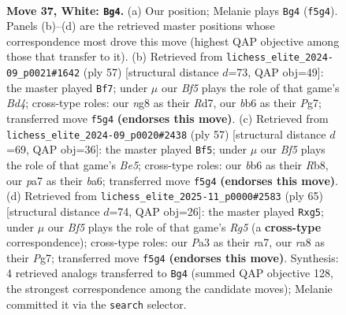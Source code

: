 \documentclass[11pt]{article}
\begin{document}
\clearpage

\begin{figure}[p]\centering
\begin{subfigure}{0.46\textwidth}\centering
\resizebox{\linewidth}{!}{%
\newchessgame
\chessboard[
  setfen={r5nr/p6p/1b3k2/5B2/2p2B2/PP5P/R1P3P1/1R5K w - - 2 37},
  showmover=false,
  pgfstyle=straightmove, color=movearrow, markmove={f5-g4}
]}
\caption{}
\end{subfigure}\hfill
\begin{subfigure}{0.46\textwidth}\centering
\resizebox{\linewidth}{!}{%
\newchessgame
\chessboard[
  setfen={1r3k2/p2r2pp/1pp5/2PbR3/5P2/1PR1N1P1/P6P/6K1 b - - 3 29},
  showmover=false,
  pgfstyle=straightmove, color=movearrow, markmove={d5-f7}
]}
\caption{}
\end{subfigure}
\\[4pt]
\begin{subfigure}{0.46\textwidth}\centering
\resizebox{\linewidth}{!}{%
\newchessgame
\chessboard[
  setfen={1r1r1k2/6pp/B4p2/RP1pp3/4b2P/2P1KP2/6P1/5R2 b - - 0 29},
  showmover=false,
  pgfstyle=straightmove, color=movearrow, markmove={e4-f5}
]}
\caption{}
\end{subfigure}\hfill
\begin{subfigure}{0.46\textwidth}\centering
\resizebox{\linewidth}{!}{%
\newchessgame
\chessboard[
  setfen={2r3k1/R4pp1/3b2p1/P2P2P1/2p3r1/2P4K/R4P2/5B2 b - - 2 33},
  showmover=false,
  pgfstyle=straightmove, color=movearrow, markmove={g4-g5}
]}
\caption{}
\end{subfigure}
\caption{\textbf{Move 37, White: \texttt{Bg4}.} (a) Our position; Melanie plays \texttt{Bg4} (\texttt{f5g4}). Panels (b)--(d) are the retrieved master positions whose correspondence most drove this move (highest QAP objective among those that transfer to it). (b) Retrieved from \texttt{lichess\_elite\_2024-09\_p0021\#1642} (ply 57) [structural distance $d$=73, QAP obj=49]: the master played \texttt{Bf7}; under $\mu$ our \emph{Bf5} plays the role of that game's \emph{Bd4}; cross-type roles: our \emph{n}g8 as their \emph{R}d7, our \emph{b}b6 as their \emph{P}g7; transferred move \texttt{f5g4} \textbf{(endorses this move)}. (c) Retrieved from \texttt{lichess\_elite\_2024-09\_p0020\#2438} (ply 57) [structural distance $d$=69, QAP obj=36]: the master played \texttt{Bf5}; under $\mu$ our \emph{Bf5} plays the role of that game's \emph{Be5}; cross-type roles: our \emph{b}b6 as their \emph{R}b8, our \emph{p}a7 as their \emph{b}a6; transferred move \texttt{f5g4} \textbf{(endorses this move)}. (d) Retrieved from \texttt{lichess\_elite\_2025-11\_p0000\#2583} (ply 65) [structural distance $d$=74, QAP obj=26]: the master played \texttt{Rxg5}; under $\mu$ our \emph{Bf5} plays the role of that game's \emph{Rg5} (a \textbf{cross-type} correspondence); cross-type roles: our \emph{P}a3 as their \emph{r}a7, our \emph{r}a8 as their \emph{P}g7; transferred move \texttt{f5g4} \textbf{(endorses this move)}. Synthesis: 4 retrieved analogs transferred to \texttt{Bg4} (summed QAP objective 128, the strongest correspondence among the candidate moves); Melanie committed it via the \texttt{search} selector.}
\label{fig:thought-m72}
\end{figure}
\end{document}
